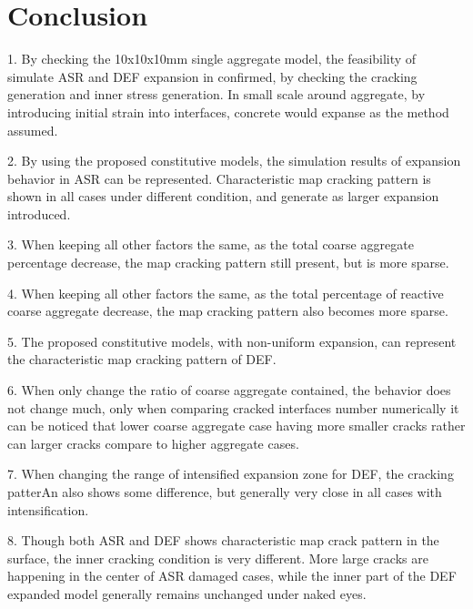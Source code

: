 \clearpage
\section{Conclusion}

1. By checking the 10x10x10mm single aggregate model, the feasibility of simulate ASR and DEF expansion in confirmed, by checking the cracking generation and inner stress generation. In small scale around aggregate, by introducing initial strain into interfaces, concrete would expanse as the method assumed.

2. By using the proposed constitutive models, the simulation results of expansion behavior in ASR can be represented. Characteristic map cracking pattern is shown in all cases under different condition, and generate as larger expansion introduced.

3. When keeping all other factors the same, as the total coarse aggregate percentage decrease, the map cracking pattern still present, but is more sparse.

4. When keeping all other factors the same, as the total percentage of reactive coarse aggregate decrease, the map cracking pattern also becomes more sparse.

5. The proposed constitutive models, with non-uniform expansion, can represent the characteristic map cracking pattern of DEF.

6. When only change the ratio of coarse aggregate contained, the behavior does not change much, only when comparing cracked interfaces number numerically it can be noticed that lower coarse aggregate case having more smaller cracks rather can larger cracks compare to higher aggregate cases.

7. When changing the range of intensified expansion zone for DEF, the cracking patterAn also shows some difference, but generally very close in all cases with intensification.

8. Though both ASR and DEF shows characteristic map crack pattern in the surface, the inner cracking condition is very different. More large cracks are happening in the center of ASR damaged cases, while the inner part of the DEF expanded model generally remains unchanged under naked eyes.
 
